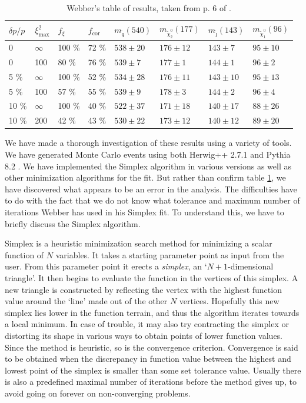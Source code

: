\documentclass[twoside,english]{uiofysmaster}
\begin{document}
\begin{table}[hbt]
	\centering
	\begin{tabular}{| l | l | l | l  || l | l | l | l |}
		\hline
		$\delta p/p$ & $\xi^2_\mathrm{max}$ & $f_\xi$ & $f_\mathrm{cor}$ & $m_{\tilde q} (540)$ & $m_{\tilde \chi_2^0} (177)$ & $m_{\tilde l} (143)$ & $m_{\tilde \chi_1^0} (96)$ \\
		\hline \hline
		0 & 	$\infty$ &	100 \%	& 72 \%	& $538 \pm 20$	&	$176 \pm 12$	&	$143 \pm 7$	& 	$95 \pm 10$	\\
		0 &		100 &		80 \%	& 76 \% & $539 \pm 7$	&	$177 \pm 1$		&	$144 \pm 1$	&	$96 \pm 2$	\\
		5 \% &	$\infty$ &	100 \%	& 52 \% & $534 \pm 28$	& 	$176 \pm 11$	&	$143 \pm 10$&	$95 \pm 13$ \\
		5 \% &	100 &		57 \%	& 55 \% & $539 \pm 9$	&	$178 \pm 3$		& 	$144 \pm 2$	&	$96 \pm 4$	\\
		10 \% &	$\infty$ &	100 \%	& 40 \% & $522 \pm 37$	&	$171 \pm 18$	&	$140 \pm 17$&	$88 \pm 26$	\\
		10 \% &	200 &		42 \%	& 43 \% & $530 \pm 22$	& 	$173 \pm 12$	&	$140 \pm 12$&	$89 \pm 20$ \\
		\hline
	\end{tabular}
	\caption{Webber's table of results, taken from p. 6 of \cite{Webber:2009vm}.}
	\label{table:webber_original}
\end{table}


We have made a thorough investigation of these results using a variety of tools. We have generated Monte Carlo events using both Herwig++ 2.7.1  \cite{Bahr:2008pv} and Pythia 8.2 \cite{Sjostrand:2014zea}. We have implemented the Simplex algorithm in various versions as well as other minimization algorithms for the fit. But rather than confirm table \ref{table:webber_original}, we have discovered what appears to be an error in the analysis. The difficulties have to do with the fact that we do not know what tolerance and maximum number of iterations Webber has used in his Simplex fit. To understand this, we have to briefly discuss the Simplex algorithm.

Simplex is a heuristic minimization search method for minimizing a scalar function of $N$ variables. It takes a starting parameter point as input from the user. From this parameter point it erects a {\it simplex}, an `$N+1$-dimensional triangle'. It then begins to evaluate the function in the vertices of this simplex. A new triangle is constructed by reflecting the vertex with the highest function value around the `line' made out of the other $N$ vertices. Hopefully this new simplex lies lower in the function terrain, and thus the algorithm iterates towards a local minimum. In case of trouble, it may also try contracting the simplex or distorting its shape in various ways to obtain points of lower function values. Since the method is heuristic, so is the convergence criterion. Convergence is said to be obtained when the discrepancy in function value between the highest and lowest point of the simplex is smaller than some set tolerance value. Usually there is also a predefined maximal number of iterations before the method gives up, to avoid going on forever on non-converging problems.
\end{document}
